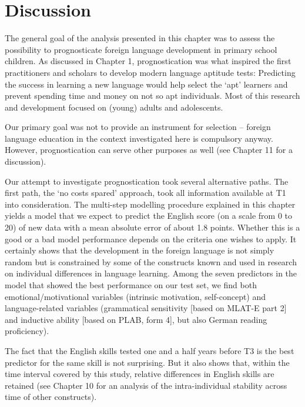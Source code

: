\documentclass[output=paper]{langsci/langscibook}
\begin{document}
\section{Discussion}

The general goal of the analysis presented in this chapter was to assess the possibility to prognosticate foreign language development in primary school children. As discussed in Chapter 1, prognostication was what inspired the first practitioners and scholars to develop modern language aptitude tests: Predicting the success in learning a new language would help select the ‘apt’ learners and prevent spending time and money on not so apt individuals. Most of this research and development focused on (young) adults and adolescents.

Our primary goal was not to provide an instrument for selection –  foreign language education in the context investigated here is compulsory anyway. However, prognostication can serve other purposes as well (see Chapter 11 for a discussion).

Our attempt to investigate prognostication took several alternative paths. The first path, the ‘no costs spared’ approach, took all information available at T1 into consideration. The multi-step modelling procedure explained in this chapter yields a model that we expect to predict the English score (on a scale from 0 to 20) of new data with a mean absolute error of about 1.8 points. Whether this is a good or a bad model performance depends on the criteria one wishes to apply. It certainly shows that the development in the foreign language is not simply random but is constrained by some of the constructs known and used in research on individual differences in language learning. Among the seven predictors in the model that showed the best performance on our test set, we find both emotional\slash motivational variables (intrinsic motivation, self-concept) and language-related variables (grammatical sensitivity [based on MLAT-E part 2] and inductive ability [based on PLAB, form 4], but also German reading proficiency). 

The fact that the English skills tested one and a half years before T3 is the best predictor for the same skill is not surprising. But it also shows that, within the time interval covered by this study, relative differences in English skills are retained (see Chapter 10 for an analysis of the intra-individual stability across time of other constructs). 
\end{document}
